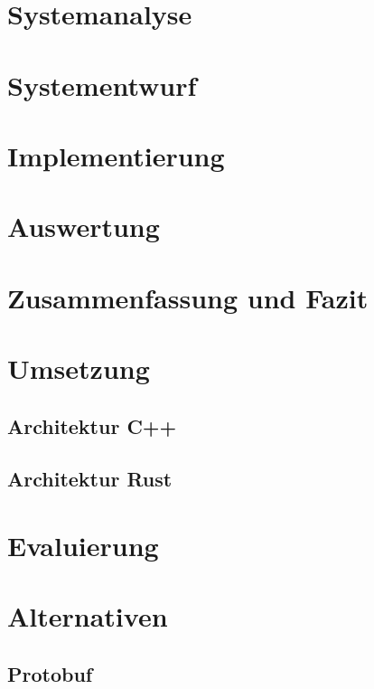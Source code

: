 \documentclass[11pt]{scrartcl}
\begin{document}
	\section{Systemanalyse}
	\section{Systementwurf}
	\section{Implementierung}
	\section{Auswertung}
	\section{Zusammenfassung und Fazit}
	
	\section{Umsetzung}
	\subsection{Architektur C++}
	\subsection{Architektur Rust}
	
	\section{Evaluierung}
	
	\section{Alternativen}
	\subsection{Protobuf}
	
	
	
	
	\clearpage
	\printbibliography
	
	\clearpage
	\printglossaries

	\clearpage
	\listoffigures
	
	
\end{document}
